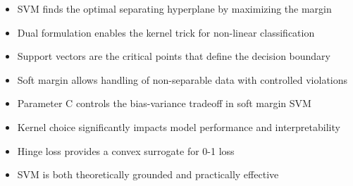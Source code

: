 \documentclass{article}
\begin{document}
\begin{itemize}
    \item SVM finds the optimal separating hyperplane by maximizing the margin
    \item Dual formulation enables the kernel trick for non-linear classification
    \item Support vectors are the critical points that define the decision boundary
    \item Soft margin allows handling of non-separable data with controlled violations
    \item Parameter C controls the bias-variance tradeoff in soft margin SVM
    \item Kernel choice significantly impacts model performance and interpretability
    \item Hinge loss provides a convex surrogate for 0-1 loss
    \item SVM is both theoretically grounded and practically effective
\end{itemize}
\end{document}
